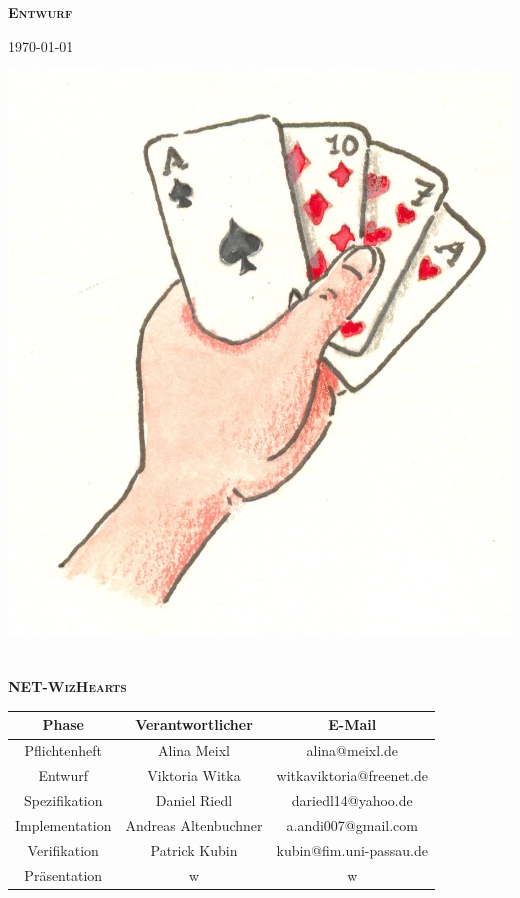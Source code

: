 \documentclass{article}
\begin{document}
\begin{titlepage}

\begin{center}
\textbf{\textsc{\LARGE Entwurf}}

{\large \today}

\vspace{2cm}
\includegraphics{kartenspiel}
\ \\
\ \\

\textbf{\textsc{\LARGE NET-WizHearts}}
\vspace{2cm}

\begin{tabular}{|c|c|c|}\hline
   Phase & Verantwortlicher & E-Mail \\ \hline\hline
   Pflichtenheft & Alina Meixl &  alina@meixl.de \\ \hline
   Entwurf & Viktoria Witka & witkaviktoria@freenet.de \\ \hline
   Spezifikation & Daniel Riedl & dariedl14@yahoo.de \\ \hline
   Implementation & Andreas Altenbuchner& a.andi007@gmail.com\\ \hline
   Verifikation & Patrick Kubin & kubin@fim.uni-passau.de\\ \hline
   Präsentation & w& w\\ \hline
 \end{tabular}

\end{center}

\end{titlepage}
\end{document}
